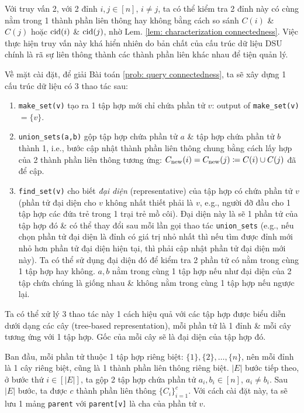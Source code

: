 \documentclass{article}
\begin{document}
Với truy vấn 2, với 2 đỉnh $i,j\in[n]$, $i\ne j$, ta có thể kiểm tra 2 đỉnh này có cùng nằm trong 1 thành phần liên thông hay không bằng cách so sánh $C(i)$ \& $C(j)$ hoặc ${\rm cid}(i)$ \& ${\rm cid}(j)$, nhờ Lem. \ref{lem: characterization connectedness}. Việc thực hiện truy vấn này khá hiển nhiên do bản chất của cấu trúc dữ liệu DSU chính là rã sự liên thông thành các thành phần liên khác nhau để tiện quản lý.

Về mặt cài đặt, để giải Bài toán \ref{prob: query connectedness}, ta sẽ xây dựng 1 cấu trúc dữ liệu có 3 thao tác sau:
\begin{enumerate}
    \item \verb|make_set(v)| tạo ra 1 tập hợp mới chỉ chứa phần tử $v$: output of \verb|make_set(v)| $= \{v\}$.
    \item \verb|union_sets(a,b)| gộp tập hợp chứa phần tử $a$ \& tập hợp chứa phần tử $b$ thành 1, i.e., bước cập nhật thành phần liên thông chung bằng cách lấy hợp của 2 thành phần liên thông tương ứng: $C_{\rm new}(i) = C_{\rm new}(j)\coloneqq C(i)\cup C(j)$ đã để cập.
    \item \verb|find_set(v)| cho biết {\it đại diện} (representative) của tập hợp có chứa phần tử $v$ (phần tử đại diện cho $v$ không nhất thiết phải là $v$, e.g., người đỡ đầu cho 1 tập hợp các đứa trẻ trong 1 trại trẻ mồ côi). Đại diện này là sẽ 1 phần tử của tập hợp đó \& có thể thay đổi sau mỗi lần gọi thao tác \verb|union_sets| (e.g., nếu chọn phần tử đại diện là đỉnh có giá trị nhỏ nhất thì nếu tìm được đỉnh mới nhỏ hơn phần tử đại diện hiện tại, thì phải cập nhật phần tử đại diện mới này). Ta có thể sử dụng đại diện đó để kiểm tra 2 phần tử có nằm trong cùng 1 tập hợp hay không. $a,b$ nằm trong cùng 1 tập hợp nếu như đại diện của 2 tập chứa chúng là giống nhau \& không nằm trong cùng 1 tập hợp nếu ngược lại.
\end{enumerate}
Ta có thể xử lý 3 thao tác này 1 cách hiệu quả với các tập hợp được biểu diễn dưới dạng các cây (tree-based representation), mỗi phần tử là 1 đỉnh \& mỗi cây tương ứng với 1 tập hợp. Gốc của mỗi cây sẽ là đại diện của tập hợp đó.

Ban đầu, mỗi phần tử thuộc 1 tập hợp riêng biệt: $\{1\},\{2\},\ldots,\{n\}$, nên mỗi đỉnh là 1 cây riêng biệt, cũng là 1 thành phần liên thông riêng biệt. $|E|$ bước tiếp theo, ở bước thứ $i\in[|E|]$, ta gộp 2 tập hợp chứa phần tử $a_i,b_i\in[n]$, $a_i\ne b_i$. Sau $|E|$ bước, ta được $c$ thành phần liên thông $\{C_i\}_{i=1}^c$. Với cách cài đặt này, ta sẽ lưu 1 mảng {\tt parent} với {\tt parent[v]} là cha của phần tử $v$.
\end{document}
